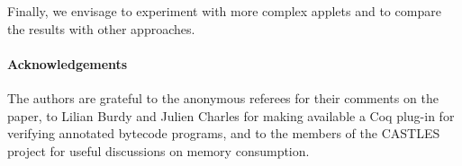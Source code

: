 Finally, we envisage to experiment with more complex applets and to
compare the results with other approaches.

\paragraph*{Acknowledgements} The authors are grateful to the anonymous
referees for their comments on the paper, to Lilian Burdy and Julien
Charles for making available a Coq plug-in for verifying annotated
bytecode programs, and to the members of the CASTLES project for
useful discussions on memory consumption.






